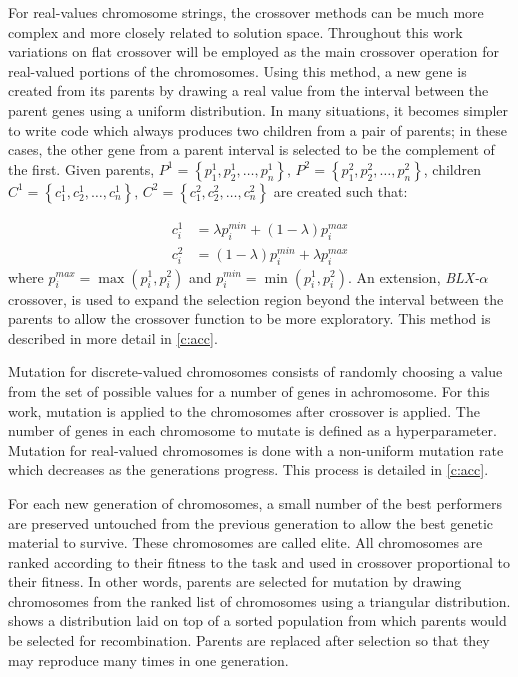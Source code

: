 For real-values chromosome strings, the crossover methods can be much more complex and more closely related to
solution space. Throughout this work variations on flat crossover will be employed as the main crossover
operation for real-valued portions of the chromosomes\cite{cordon:01bk}. Using this method, a new gene is
created from its parents by drawing a real value from the interval between the parent genes using a uniform
distribution. In many situations, it becomes simpler to write code which always produces two children from a
pair of parents; in these cases, the other gene from a parent interval is selected to be the complement of the
first. Given parents, $P^1 = \left\{p_1^1, p_2^1, \dots, p_n^1\right\},\,P^2=\left\{p_1^2,p_2^2, \dots,
p_n^2\right\}$, children
$C^1=\left\{c_1^1, c_2^1, \dots, c_n^1\right\},\,C^2=\left\{c_1^2,c_2^2,\dots,c_n^2\right\}$ are
created such that:

\begin{align}
    c_i^1 &= \lambda p_i^{min} + (1 - \lambda)p_i^{max}\label{e:flat_cx_c1}\\
    c_i^2 &= (1-\lambda)p_i^{min} + \lambda p_i^{max}\label{e:flat_cx_c2}
\end{align}
where $p_i^{max}=\max(p_i^1,p_i^2)$ and $p_i^{min}=\min(p_i^1,p_i^2)$. An extension, \emph{BLX-$\alpha$}
crossover, is used to expand the selection region beyond the interval between the parents to allow the
crossover function to be more exploratory\cite{cordon:01bk}. This method is described in more detail in
\cref{c:acc}.

Mutation for discrete-valued chromosomes consists of randomly choosing a value from the set of possible values
for a number of genes in achromosome. For this work, mutation is applied to the chromosomes after crossover is
applied. The number of genes in each chromosome to mutate is defined as a hyperparameter. Mutation for
real-valued chromosomes is done with a non-uniform mutation rate which decreases as the generations progress.
This process is detailed in \cref{c:acc}.

For each new generation of chromosomes, a small number of the best performers are preserved untouched from the
previous generation to allow the best genetic material to survive. These chromosomes are called elite. All
chromosomes are ranked according to their fitness to the task and used in crossover proportional to their
fitness. In other words, parents are selected for mutation by drawing chromosomes from the ranked list of
chromosomes using a triangular distribution.  shows a distribution laid on top of a sorted
population from which parents would be selected for  recombination. Parents are replaced after selection so
that they may reproduce many times in one generation.

